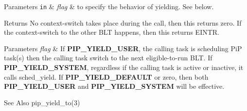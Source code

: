 \begin{DoxyParams}[1]{Parameters}
\mbox{\tt in}  & {\em flag} & to specify the behavior of yielding. See below.\\
\hline
\end{DoxyParams}
\begin{DoxyReturn}{Returns}
No context-\/switch takes place during the call, then this returns zero. If the context-\/switch to the other B\-L\-T happens, then this returns {\ttfamily E\-I\-N\-T\-R}.
\end{DoxyReturn}

\begin{DoxyParams}{Parameters}
{\em flag} & If {\bfseries P\-I\-P\-\_\-\-Y\-I\-E\-L\-D\-\_\-\-U\-S\-E\-R}, the calling task is scheduling Pi\-P task(s) then the calling task switch to the next eligible-\/to-\/run B\-L\-T. If {\bfseries P\-I\-P\-\_\-\-Y\-I\-E\-L\-D\-\_\-\-S\-Y\-S\-T\-E\-M}, regardless if the calling task is active or inactive, it calls {\ttfamily sched\-\_\-yield}. If {\bfseries P\-I\-P\-\_\-\-Y\-I\-E\-L\-D\-\_\-\-D\-E\-F\-A\-U\-L\-T} or zero, then both {\bfseries P\-I\-P\-\_\-\-Y\-I\-E\-L\-D\-\_\-\-U\-S\-E\-R} and {\bfseries P\-I\-P\-\_\-\-Y\-I\-E\-L\-D\-\_\-\-S\-Y\-S\-T\-E\-M} will be effective.\\
\hline
\end{DoxyParams}
\begin{DoxySeeAlso}{See Also}
pip\-\_\-yield\-\_\-to(3) 
\end{DoxySeeAlso}

